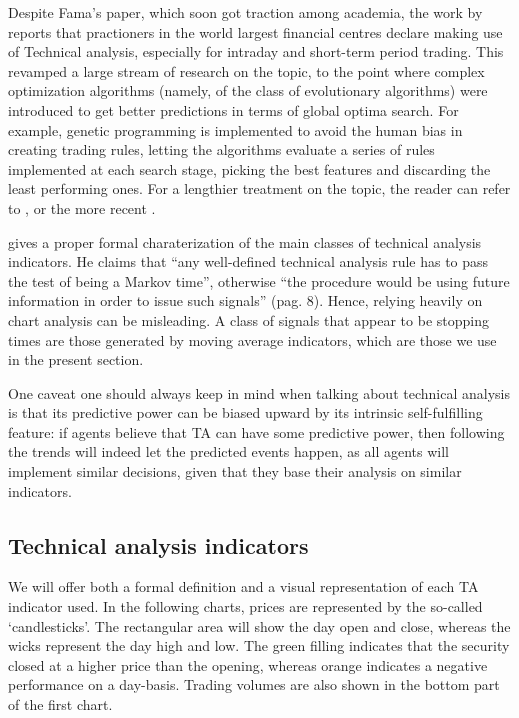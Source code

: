 \documentclass[
  11pt,
]{article}
\begin{document}
Despite Fama's paper, which soon got traction among academia, the work
by \citet{Taylor1992} reports that practioners in the world largest
financial centres declare making use of Technical analysis, especially
for intraday and short-term period trading. This revamped a large stream
of research on the topic, to the point where complex optimization
algorithms (namely, of the class of evolutionary algorithms) were
introduced to get better predictions in terms of global optima search.
For example, genetic programming is implemented to avoid the human bias
in creating trading rules, letting the algorithms evaluate a series of
rules implemented at each search stage, picking the best features and
discarding the least performing ones. For a lengthier treatment on the
topic, the reader can refer to \citet{Neely1997}, or the more recent
\citet{Mousavi2014} .

\citet{Neftci1991} gives a proper formal charaterization of the main
classes of technical analysis indicators. He claims that ``any
well-defined technical analysis rule has to pass the test of being a
Markov time'', otherwise ``the procedure would be using future
information in order to issue such signals'' (pag. 8). Hence, relying
heavily on chart analysis can be misleading. A class of signals that
appear to be stopping times are those generated by moving average
indicators, which are those we use in the present section.

One caveat one should always keep in mind when talking about technical
analysis is that its predictive power can be biased upward by its
intrinsic self-fulfilling feature: if agents believe that TA can have
some predictive power, then following the trends will indeed let the
predicted events happen, as all agents will implement similar decisions,
given that they base their analysis on similar indicators.

\hypertarget{technical-analysis-indicators}{%
\subsection{Technical analysis
indicators}\label{technical-analysis-indicators}}

We will offer both a formal definition and a visual representation of
each TA indicator used. In the following charts, prices are represented
by the so-called `candlesticks'. The rectangular area will show the day
open and close, whereas the wicks represent the day high and low. The
green filling indicates that the security closed at a higher price than
the opening, whereas orange indicates a negative performance on a
day-basis. Trading volumes are also shown in the bottom part of the
first chart.
\end{document}

